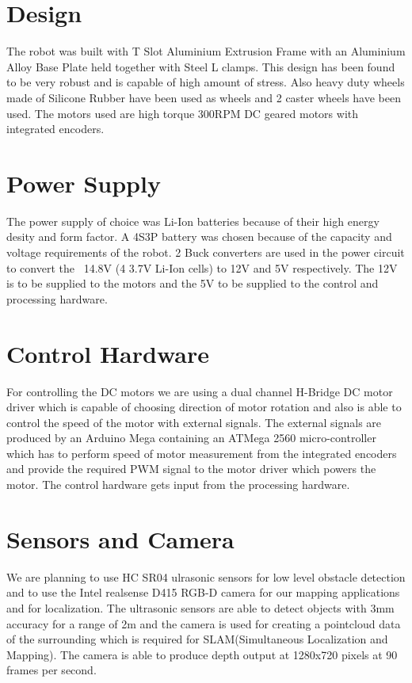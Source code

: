 \documentclass{article}
\begin{document}
\section{Design}
The robot was built with T Slot Aluminium Extrusion Frame with an Aluminium Alloy Base Plate held together with Steel L clamps. This design has been found to be very robust and is capable of high amount of stress. Also heavy duty wheels made of Silicone Rubber have been used as wheels and 2 caster wheels have been used. The motors used are high torque 300RPM DC geared motors with integrated encoders.

\section{Power Supply}
The power supply of choice was Li-Ion batteries because of their high energy desity and form factor. A 4S3P battery was chosen because of the capacity and voltage requirements of the robot. 2 Buck converters are used in the power circuit to convert the ~14.8V (4 3.7V Li-Ion cells) to 12V and 5V respectively. The 12V is to be supplied to the motors and the 5V to be supplied to the control and processing hardware.

\section{Control Hardware}
For controlling the DC motors we are using a dual channel H-Bridge DC motor driver which is capable of choosing direction of motor rotation and also is able to control the speed of the motor with external signals. The external signals are produced by an Arduino Mega containing an ATMega 2560 micro-controller which has to perform speed of motor measurement from the integrated encoders and provide the required PWM signal to the motor driver which powers the motor. The control hardware gets input from the processing hardware.

\section{Sensors and Camera}
We are planning to use HC SR04 ulrasonic sensors for low level obstacle detection and to use the Intel realsense D415 RGB-D camera for our mapping applications and for localization. The ultrasonic sensors are able to detect objects with 3mm accuracy for a range of 2m and the camera is used for creating a pointcloud data of the surrounding which is required for SLAM(Simultaneous Localization and Mapping). The camera is able to produce depth output at 1280x720 pixels at 90 frames per second.
\end{document}
